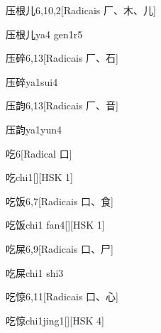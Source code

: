 \begin{entry}{压根儿}{6,10,2}[Radicais ⼚、⽊、⼉]
  \begin{phonetics}{压根儿}{ya4 gen1r5}
  \end{phonetics}
\end{entry}

\begin{entry}{压碎}{6,13}[Radicais ⼚、⽯]
  \begin{phonetics}{压碎}{ya1sui4}
  \end{phonetics}
\end{entry}

\begin{entry}{压韵}{6,13}[Radicais ⼚、⾳]
  \begin{phonetics}{压韵}{ya1yun4}
  \end{phonetics}
\end{entry}

\begin{entry}{吃}{6}[Radical ⼝]
  \begin{phonetics}{吃}{chi1}[][HSK 1]
  \end{phonetics}
\end{entry}

\begin{entry}{吃饭}{6,7}[Radicais ⼝、⾷]
  \begin{phonetics}{吃饭}{chi1 fan4}[][HSK 1]
  \end{phonetics}
\end{entry}

\begin{entry}{吃屎}{6,9}[Radicais ⼝、⼫]
  \begin{phonetics}{吃屎}{chi1 shi3}
  \end{phonetics}
\end{entry}

\begin{entry}{吃惊}{6,11}[Radicais ⼝、⼼]
  \begin{phonetics}{吃惊}{chi1jing1}[][HSK 4]
  \end{phonetics}
\end{entry}

